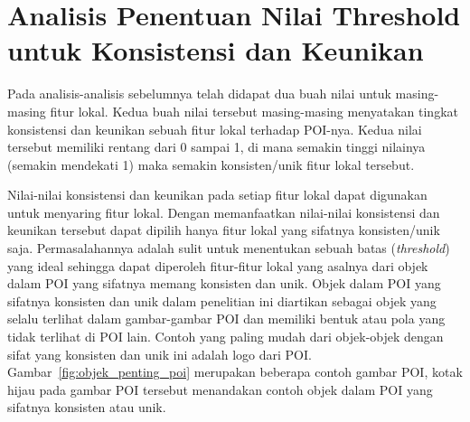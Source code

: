 %
%
%

\section{Analisis Penentuan Nilai Threshold untuk Konsistensi dan Keunikan}
\label{sec:analisis_threshold}
Pada analisis-analisis sebelumnya telah didapat dua buah nilai untuk masing-masing fitur lokal. Kedua buah nilai tersebut masing-masing menyatakan tingkat konsistensi dan keunikan sebuah fitur lokal terhadap POI-nya. Kedua nilai tersebut memiliki rentang dari 0 sampai 1, di mana semakin tinggi nilainya (semakin mendekati 1) maka semakin konsisten/unik fitur lokal tersebut. 

Nilai-nilai konsistensi dan keunikan pada setiap fitur lokal dapat digunakan untuk menyaring fitur lokal. Dengan memanfaatkan nilai-nilai konsistensi dan keunikan tersebut dapat dipilih hanya fitur lokal yang sifatnya konsisten/unik saja. Permasalahannya adalah sulit untuk menentukan sebuah batas (\textit{threshold}) yang ideal sehingga dapat diperoleh fitur-fitur lokal yang asalnya dari objek dalam POI yang sifatnya memang konsisten dan unik. Objek dalam POI yang sifatnya konsisten dan unik dalam penelitian ini diartikan sebagai objek yang selalu terlihat dalam gambar-gambar POI dan memiliki bentuk atau pola yang tidak terlihat di POI lain. Contoh yang paling mudah dari objek-objek dengan sifat yang konsisten dan unik ini adalah logo dari POI. Gambar~\ref{fig:objek_penting_poi} merupakan beberapa contoh gambar POI, kotak hijau pada gambar POI tersebut menandakan contoh objek dalam POI yang sifatnya konsisten atau unik.

